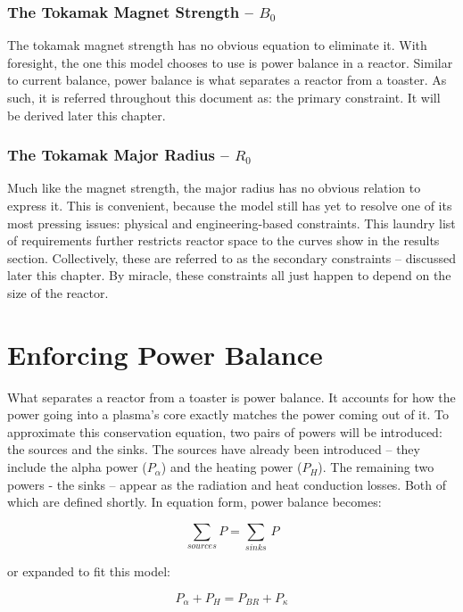 \subsubsection{The Tokamak Magnet Strength -- $B_0$}

The tokamak magnet strength has no obvious equation to eliminate it. With foresight, the one this model chooses to use is power balance in a reactor. Similar to current balance, power balance is what separates a reactor from a toaster. As such, it is referred throughout this document as: the primary constraint. It will be derived later this chapter.

\subsubsection{The Tokamak Major Radius -- $R_0$}

Much like the magnet strength, the major radius has no obvious relation to express it. This is convenient, because the model still has yet to resolve one of its most pressing issues: physical and engineering-based constraints. This laundry list of requirements further restricts reactor space to the curves show in the results section. Collectively, these are referred to as the secondary constraints -- discussed later this chapter. By miracle, these constraints all just happen to depend on the size of the reactor. 

\section{Enforcing Power Balance}

What separates a reactor from a toaster is power balance. It accounts for how the power going into a plasma's core exactly matches the power coming out of it. To approximate this conservation equation, two pairs of powers will be introduced: the sources and the sinks. The sources have already been introduced -- they include the alpha power ($P_\alpha$) and the heating power ($P_H$). The remaining two powers - the sinks -- appear as the radiation and heat conduction losses. Both of which are defined shortly. In equation form, power balance becomes:

\begin{equation}
	\sum_{sources} P = \sum_{sinks} \, P
\end{equation}

or expanded to fit this model:

\begin{equation}
	P_\alpha + P_H = P_{BR} + P_\kappa
\end{equation}

